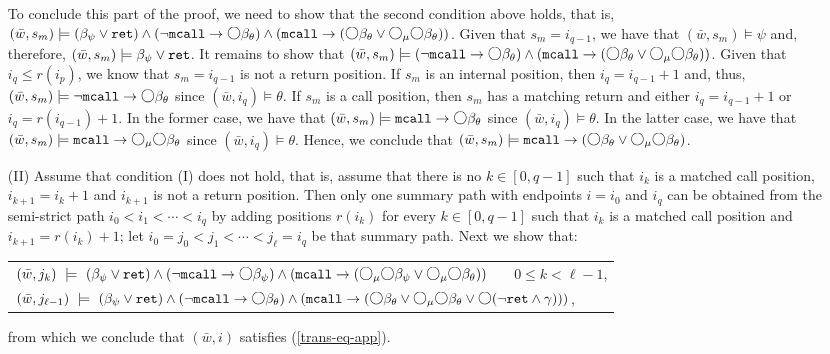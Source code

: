 \documentclass{LMCS}
\newcommand{\M}{{\mu}}
\newcommand{\w}{{\bar{w}}}
\newcommand{\dm}{\Diamond}
\newcommand{\next}{\text{\raisebox{1pt}{$\bigcirc$}}}
\theoremstyle{plain}
\theoremstyle{definition}
\newcommand{\mcall}{{\tt{mcall}}}
\newcommand{\rett}{{\tt ret}}
\newcommand{\dmm}{\dm_{\M}}
\renewcommand{\dm}{\next}
\renewcommand{\dmm}{\dm_\M}
\begin{document}
\begin{enumerate}[(a)]
To conclude this part of the proof, we need to show that the second
condition above holds, that is, $(\w, s_m) \models (\beta_\psi \vee
\rett) \wedge (\neg\mcall \to \dm \beta_\theta) \wedge (\mcall \to
(\dm \beta_\theta \vee \dmm \dm \beta_\theta))$. Given that $s_m =
i_{q-1}$, we have that $(\w, s_m) \models \psi$ and, therefore, $(\w,
s_m) \models \beta_\psi \vee
\rett$. It remains to show that $(\w, s_m) \models (\neg\mcall \to \dm
\beta_\theta) \wedge (\mcall \to (\dm \beta_\theta \vee \dmm \dm
\beta_\theta))$. Given that 
$i_q \leq r(i_p)$, we know that $s_m = i_{q-1}$ is not a return
position. If $s_m$ is an internal position, then $i_q = i_{q-1}+1$
and, thus, $(\w, s_m) \models \neg\mcall \to \dm
\beta_\theta$ since $(\w, i_q) \models \theta$. If $s_m$ is a call
position, then $s_m$ has a matching return and either $i_q =
i_{q-1}+1$ or $i_q = r(i_{q-1})+1$. In the former case, we have that
$(\w, s_m) \models \mcall \to \dm
\beta_\theta$ since $(\w, i_q) \models \theta$. In the latter case,
we have that $(\w, s_m) \models \mcall \to \dmm \dm \beta_\theta$
since $(\w, i_q) \models \theta$. Hence, we conclude that $(\w, s_m)
\models \mcall \to (\dm \beta_\theta \vee \dmm \dm \beta_\theta)$.

\item[(II)] Assume that condition (I) does not hold, that is, assume
that there is no $k \in [0,q-1]$ such that $i_k$ is a matched call
position, $i_{k+1} = i_k+1$ and $i_{k+1}$ is not a return
position. Then only one summary path with endpoints $i = i_0$ and
$i_q$ can be obtained from the semi-strict path $i_0 < i_1 <
\cdots < i_q$ by adding positions $r(i_k)$ for every $k \in [0,q-1]$
such that $i_k$ is a matched call position and $i_{k+1} = r(i_k)+1$;
let $i_0 = j_0 < j_1 < \cdots < j_\ell = i_q$ be that summary
path. Next we show that: 
{\small
\begin{tabular}{l}
\hspace{-2mm}$(\w, j_k) \ \models \ (\beta_\psi \vee \rett) \wedge (\neg \mcall
\to \dm \beta_\psi) \wedge (\mcall \to (\dmm \dm \beta_\psi \vee \dmm
\dm \beta_\theta))$ \ \ \
$0 \leq k < \ell-1$,\\ 
\hspace{-2mm}$(\w, j_{\ell-1}) \ \models \  (\beta_\psi \vee \rett) \wedge (\neg \mcall \to
\dm \beta_\theta) \wedge (\mcall \to (\dm \beta_\theta \vee \dmm \dm
\beta_\theta \vee \dm (\neg \rett \wedge \gamma)))$,
\end{tabular}}

\noindent
from which we conclude that $(\w, i)$ satisfies (\ref{trans-eq-app}).


\end{enumerate}
\end{document}
